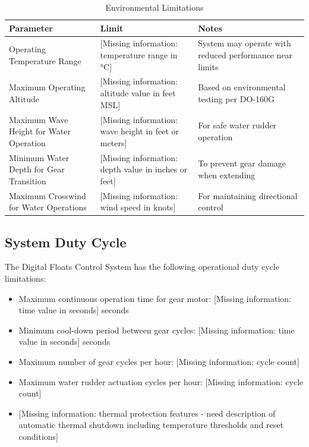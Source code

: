 \documentclass[12pt,a4paper,twoside,openright]{book}
\newcommand{\tabletextfont}{\normalfont\rmfamily}
\newcommand{\tableheadfont}{\normalfont\bfseries}
\begin{document}
\begin{table}[h]
    \centering
\setlength{\tabcolsep}{5pt} %
\begin{tabular}{|p{}|p{}|p{}|}
\hline
\tableheadfont\textbf{Parameter} & \tableheadfont\textbf{Limit} & \tableheadfont\textbf{Notes} \\
\hline
\tabletextfont Operating Temperature Range & {\color{red}[Missing information: temperature range in °C]} & System may operate with reduced performance near limits \\
\hline
\tabletextfont Maximum Operating Altitude & {\color{red}[Missing information: altitude value in feet MSL]} & Based on environmental testing per DO-160G \\
\hline
\tabletextfont Maximum Wave Height for Water Operation & {\color{red}[Missing information: wave height in feet or meters]} & For safe water rudder operation \\
\hline
\tabletextfont Minimum Water Depth for Gear Transition & {\color{red}[Missing information: depth value in inches or feet]} & To prevent gear damage when extending \\
\hline
\tabletextfont Maximum Crosswind for Water Operations & {\color{red}[Missing information: wind speed in knots]} & For maintaining directional control \\
\hline
\end{tabular}
\caption{Environmental Limitations}
\end{table}

\subsection{System Duty Cycle}

The Digital Floats Control System has the following operational duty cycle limitations:

\begin{itemize}
    \item Maximum continuous operation time for gear motor: {\color{red}[Missing information: time value in seconds]} seconds
    \item Minimum cool-down period between gear cycles: {\color{red}[Missing information: time value in seconds]} seconds
    \item Maximum number of gear cycles per hour: {\color{red}[Missing information: cycle count]}
    \item Maximum water rudder actuation cycles per hour: {\color{red}[Missing information: cycle count]}
    \item {\color{red}[Missing information: thermal protection features - need description of automatic thermal shutdown including temperature thresholds and reset conditions]}
\end{itemize}
\end{document}
